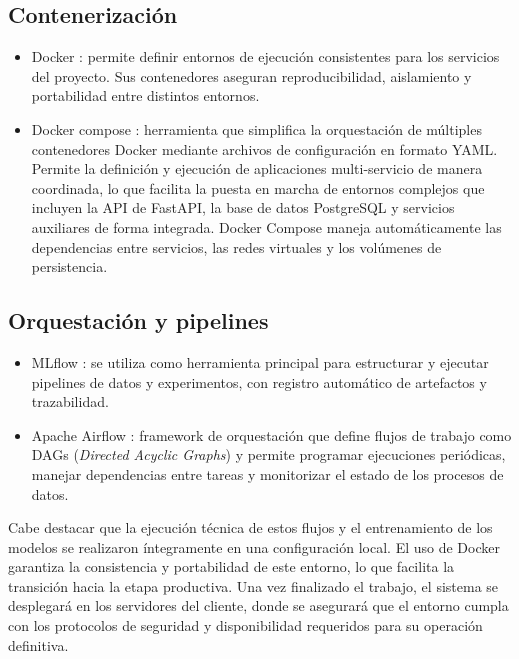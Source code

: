 \subsection{Contenerización}
\begin{itemize}
	\item Docker \citep{docker}: permite definir entornos de ejecución consistentes para los servicios del proyecto. Sus contenedores aseguran reproducibilidad, aislamiento y portabilidad entre distintos entornos.
	
	\item Docker compose \citep{docker_compose}: herramienta que simplifica la orquestación de múltiples contenedores Docker mediante archivos de configuración en formato YAML. Permite la definición y ejecución de aplicaciones multi-servicio de manera coordinada, lo que facilita la puesta en marcha de entornos complejos que incluyen la API de FastAPI, la base de datos PostgreSQL y servicios auxiliares de forma integrada. Docker Compose maneja automáticamente las dependencias entre servicios, las redes virtuales y los volúmenes de persistencia.
\end{itemize}

\subsection{Orquestación y pipelines}
\begin{itemize}
	\item MLflow \citep{mlflow}: se utiliza como herramienta principal para estructurar y ejecutar pipelines de datos y experimentos, con registro automático de artefactos y trazabilidad.

	\item Apache Airflow \citep{airflow}: framework de orquestación que define flujos de trabajo como DAGs (\textit{Directed Acyclic Graphs}) \citep{airflow_dags} y permite programar ejecuciones periódicas, manejar dependencias entre tareas y monitorizar el estado de los procesos de datos.
	
\end{itemize}


Cabe destacar que la ejecución técnica de estos flujos y el entrenamiento de los modelos se realizaron íntegramente en una configuración local. El uso de Docker garantiza la consistencia y portabilidad de este entorno, lo que facilita la transición hacia la etapa productiva. Una vez finalizado el trabajo, el sistema se desplegará en los servidores del cliente, donde se asegurará que el entorno cumpla con los protocolos de seguridad y disponibilidad requeridos para su operación definitiva.